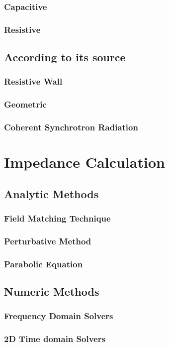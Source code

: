 \documentclass[
	12pt,				%
	openright,			%
	oneside,			%
	a4paper,		%
	chapter=TITLE,		%
	section=TITLE,		%
    brazil,				%
	english,			%
	sumario=tradicional,
	]{abntex2}
\begin{document}
      \subsubsection{Capacitive}
      \subsubsection{Resistive}
    \subsection{According to its source}
      \subsubsection{Resistive Wall}
      \subsubsection{Geometric}
      \subsubsection{Coherent Synchrotron Radiation}
  \section{Impedance Calculation}
    \subsection{Analytic Methods}
      \subsubsection{Field Matching Technique}
      \subsubsection{Perturbative Method}
      \subsubsection{Parabolic Equation}
    \subsection{Numeric Methods}
      \subsubsection{Frequency Domain Solvers}
      \subsubsection{2D Time domain Solvers}
\end{document}
